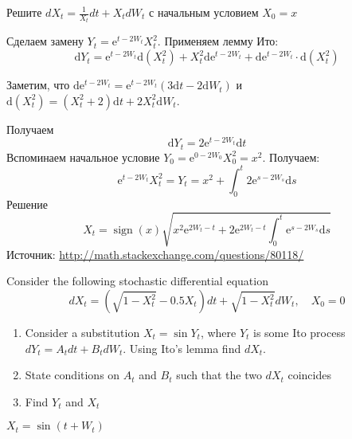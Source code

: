 \begin{problem}
Решите $dX_t=\frac{1}{X_t}dt+X_tdW_t$ с начальным условием  $X_0=x$

\begin{sol}
Сделаем замену $Y_t = \mathrm{e}^{t- 2 W_t} X_t^2$. Применяем лемму Ито:
\begin{equation}
  \mathrm{d} Y_t = \mathrm{e}^{t- 2 W_t} \mathrm{d} (X_t^2) + X_t^2 \mathrm{d} \mathrm{e}^{t- 2 W_t} + \mathrm{d} \mathrm{e}^{t- 2 W_t} \cdot \mathrm{d} (X_t^2)
\end{equation}

Заметим, что $\mathrm{d} \mathrm{e}^{t- 2 W_t} = \mathrm{e}^{t- 2 W_t} \left( 3 \mathrm{d} t - 2 \mathrm{d} W_t \right)$ и $\mathrm{d}(X_t^2) = (X_t^2 + 2) \mathrm{d} t + 2 X_t^2 \mathrm{d} W_t$.

Получаем
\begin{equation}
  \mathrm{d} Y_t = 2 \mathrm{e}^{t- 2 W_t} \mathrm{d} t
\end{equation}
Вспоминаем начальное условие $Y_0 = \mathrm{e}^{0 - 2 W_0}X_0^2 = x^2$. Получаем:
\begin{equation}
   \mathrm{e}^{t- 2 W_t} X_t^2 = Y_t =  x^2 + \int_0^t 2 \mathrm{e}^{s - 2 W_s} \mathrm{d} s
\end{equation}
Решение
\begin{equation}
  X_t = \operatorname{sign}(x) \sqrt{ x^2 \mathrm{e}^{2 W_t - t} + 2 \mathrm{e}^{2 W_t - t} \int_0^t \mathrm{e}^{s - 2 W_s} \mathrm{d} s  }
\end{equation}
Источник: \url{http://math.stackexchange.com/questions/80118/}

\end{sol}
\end{problem}

\begin{problem}
Consider the following stochastic differential equation
\begin{equation}
dX_t=(\sqrt{1-X_t^2}-0.5X_t)dt+\sqrt{1-X_t^2}dW_t, \quad X_0=0
\end{equation}
\begin{enumerate}
\item Consider a substitution $X_t=\sin Y_t$, where $Y_t$ is some Ito process $dY_t=A_tdt+B_tdW_t$. Using Ito's lemma find $dX_t$.
\item State conditions on $A_t$ and $B_t$ such that the two $dX_t$ coincides
\item Find $Y_t$ and $X_t$
\end{enumerate}

\begin{sol}
$X_t=\sin(t+W_t)$
\end{sol}
\end{problem}


